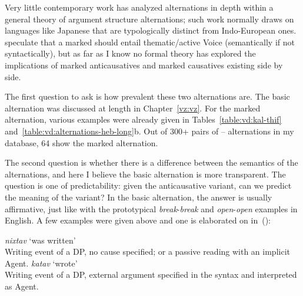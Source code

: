 \begin{exe}
\begin{xlist}
\begin{xlist}
\begin{exe}
\begin{exe}
\begin{xlist}
\begin{exe}
\begin{xlist}
\begin{exe}
\begin{xlist}
\begin{xlist}
\begin{exe}
\begin{xlist}
\begin{exe}
\begin{xlist}
\begin{exe}
\begin{exe}
\begin{exe}
\begin{xlist}
\begin{exe}
\begin{exe}
\begin{xlist}
\begin{xlist}
\begin{exe}
\begin{xlist}
\begin{exe}
\begin{exe}
\begin{exe}
\begin{xlist}
\begin{exe}
\begin{exe}
\begin{xlist}
\begin{exe}
\begin{xlist}
\begin{exe}
\begin{xlist}
\begin{exe}
\begin{xlist}
\begin{exe}
Very little contemporary work has analyzed  alternations in depth within a general theory of argument structure alternations; such work normally draws on languages like Japanese \citep{jacobsen92} that are typologically distinct from Indo-European ones. \citet[62ff]{layering15} speculate that a marked  should entail thematic/active Voice (semantically if not syntactically), but as far as I know no formal theory has explored the implications of marked anticausatives and marked causatives existing side by side.

The first question to ask is how prevalent these two alternations are. The basic alternation was discussed at length in Chapter~\ref{vz:vz}. For the marked alternation, various examples were already given in Tables~\ref{table:vd:kal-thif} and~\ref{table:vd:alternations-heb-long}b. Out of 300+ pairs of {\tkal}--{\thif} alternations in my database, 64 show the marked alternation.

The second question is whether there is a difference between the semantics of the alternations, and here I believe the basic alternation is more transparent. The question is one of predictability: given the anticausative variant, can we predict the meaning of the  variant? In the basic alternation, the answer is usually affirmative, just like with the prototypical \emph{break}-\emph{break} and \emph{open}-\emph{open} examples in English. A few examples were given  above and one is elaborated on in~(\nextx):
 \begin{exe}
 \ex  
 \begin{xlist} 
 	\ex  \emph{nixtav} `was written' \\
		Writing event of a DP, no cause specified; or a passive reading with an implicit Agent.
 	\ex  \emph{katav} `wrote' \\
		Writing event of a DP, external argument specified in the syntax and interpreted as Agent.
 \z
\z 


\end{xlist}
\end{exe}
\end{exe}
\end{xlist}
\end{exe}
\end{xlist}
\end{exe}
\end{xlist}
\end{exe}
\end{xlist}
\end{exe}
\end{exe}
\end{xlist}
\end{exe}
\end{exe}
\end{exe}
\end{xlist}
\end{exe}
\end{xlist}
\end{xlist}
\end{exe}
\end{exe}
\end{xlist}
\end{exe}
\end{exe}
\end{exe}
\end{xlist}
\end{exe}
\end{xlist}
\end{exe}
\end{xlist}
\end{xlist}
\end{exe}
\end{xlist}
\end{exe}
\end{xlist}
\end{exe}
\end{exe}
\end{xlist}
\end{xlist}
\end{exe}
